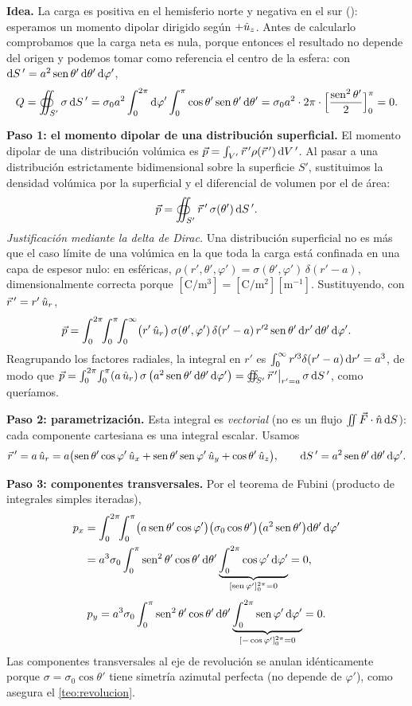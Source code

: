 \begin{resolucion}
\textbf{Idea.} La carga es positiva en el hemisferio norte y negativa en el sur (): esperamos un momento dipolar dirigido según $+\hat{u}_{z}$. Antes de
calcularlo comprobamos que la carga neta es nula, porque entonces el resultado no depende del origen y podemos tomar como referencia el centro de la esfera:
con $\mathrm{d} S\,'=a^{2}\operatorname{sen}\theta'\,\mathrm{d}\theta'\,\mathrm{d}\varphi'$,
\[
  Q=\oiint_{S'}\sigma\,\mathrm{d} S\,'=\sigma_0a^{2}\int_{0}^{2\pi}\mathrm{d}\varphi'\int_{0}^{\pi}\cos\theta'\operatorname{sen}\theta'\,\mathrm{d}\theta'=\sigma_0a^{2}\cdot2\pi\cdot\Bigl[\frac{\operatorname{sen}^{2}\theta'}{2}\Bigr]_{0}^{\pi}=0 .
\]

\textbf{Paso 1: el momento dipolar de una distribución superficial.} El momento dipolar de una distribución volúmica es $\vec{p}=\int_{V'}\vec{r}\,'\rho(\vec{r}\,')\,\mathrm{d} V\,'$. Al pasar a una distribución
estrictamente bidimensional sobre la superficie $S'$, sustituimos la densidad volúmica por la superficial y el diferencial de volumen por el de área:
\[
  \vec{p}=\oiint_{S'}\vec{r}\,'\,\sigma(\theta')\,\mathrm{d} S\,' .
\]
\emph{Justificación mediante la delta de Dirac.} Una distribución superficial no es más que el caso límite de una volúmica en la que toda la carga está confinada en una capa de espesor
nulo: en esféricas, $\rho(r',\theta',\varphi')=\sigma(\theta',\varphi')\,\delta(r'-a)$, dimensionalmente correcta porque $[\mathrm{C/m^{3}}]=[\mathrm{C/m^{2}}][\mathrm{m^{-1}}]$.
Sustituyendo, con $\vec{r}\,'=r'\,\hat{u}_{r}$,
\[
  \vec{p}=\int_{0}^{2\pi}\!\!\int_{0}^{\pi}\!\!\int_{0}^{\infty}\bigl(r'\,\hat{u}_{r}\bigr)\,\sigma(\theta',\varphi')\,\delta(r'-a)\,r'^{2}\operatorname{sen}\theta'\,\mathrm{d} r'\,\mathrm{d}\theta'\,\mathrm{d}\varphi' .
\]
Reagrupando los factores radiales, la integral en $r'$ es $\int_{0}^{\infty}r'^{3}\delta(r'-a)\,\mathrm{d} r'=a^{3}$, de modo que
$\vec{p}=\int_{0}^{2\pi}\!\int_{0}^{\pi}(a\,\hat{u}_{r})\,\sigma\,\bigl(a^{2}\operatorname{sen}\theta'\,\mathrm{d}\theta'\,\mathrm{d}\varphi'\bigr)=\oiint_{S'}\vec{r}\,'\big|_{r'=a}\,\sigma\,\mathrm{d} S\,'$, como queríamos.

\textbf{Paso 2: parametrización.} Esta integral es \emph{vectorial} (no es un flujo $\iint\vec{F}\cdot\hat{n}\,\mathrm{d} S$): cada componente cartesiana es una integral escalar. Usamos
\[
  \vec{r}\,'=a\,\hat{u}_{r}=a\bigl(\operatorname{sen}\theta'\cos\varphi'\,\hat{u}_{x}+\operatorname{sen}\theta'\operatorname{sen}\varphi'\,\hat{u}_{y}+\cos\theta'\,\hat{u}_{z}\bigr),\qquad \mathrm{d} S\,'=a^{2}\operatorname{sen}\theta'\,\mathrm{d}\theta'\,\mathrm{d}\varphi' .
\]

\textbf{Paso 3: componentes transversales.} Por el teorema de Fubini (producto de integrales simples iteradas),
\begin{align*}
  p_x&=\int_{0}^{2\pi}\!\!\int_{0}^{\pi}\bigl(a\operatorname{sen}\theta'\cos\varphi'\bigr)\bigl(\sigma_0\cos\theta'\bigr)\bigl(a^{2}\operatorname{sen}\theta'\bigr)\mathrm{d}\theta'\,\mathrm{d}\varphi'\\
  &=a^{3}\sigma_0\int_{0}^{\pi}\operatorname{sen}^{2}\theta'\cos\theta'\,\mathrm{d}\theta'\underbrace{\int_{0}^{2\pi}\cos\varphi'\,\mathrm{d}\varphi'}_{[\operatorname{sen}\varphi']_{0}^{2\pi}=0}=0,
\end{align*}
\[
  p_y=a^{3}\sigma_0\int_{0}^{\pi}\operatorname{sen}^{2}\theta'\cos\theta'\,\mathrm{d}\theta'\underbrace{\int_{0}^{2\pi}\operatorname{sen}\varphi'\,\mathrm{d}\varphi'}_{[-\cos\varphi']_{0}^{2\pi}=0}=0 .
\]
Las componentes transversales al eje de revolución se anulan idénticamente porque $\sigma=\sigma_0\cos\theta'$ tiene simetría azimutal perfecta (no depende de $\varphi'$),
como asegura el \cref{teo:revolucion}.


\end{resolucion}
